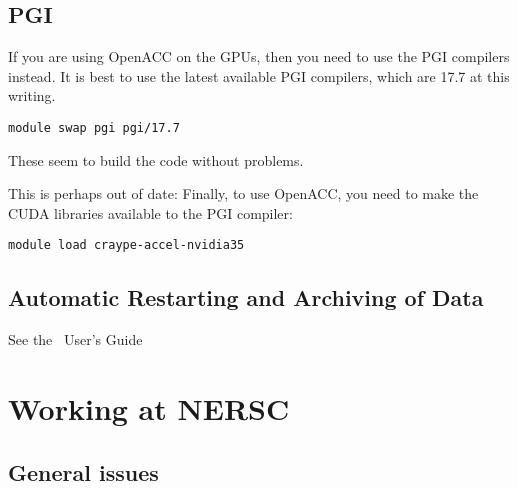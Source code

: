 

\subsection{PGI}

If you are using OpenACC on the GPUs, then you need to use the PGI
compilers instead.  It is best to use the latest available PGI
compilers, which are 17.7 at this writing.  
\begin{verbatim}
module swap pgi pgi/17.7
\end{verbatim}

These seem to build the code without problems.

This is perhaps out of date:
Finally, to use OpenACC, you need to make the CUDA libraries available to the PGI compiler:
\begin{verbatim}
module load craype-accel-nvidia35
\end{verbatim}

\subsection{Automatic Restarting and Archiving of Data}

See the \maestro\ User's Guide


\section{Working at NERSC}

\subsection{General issues}




